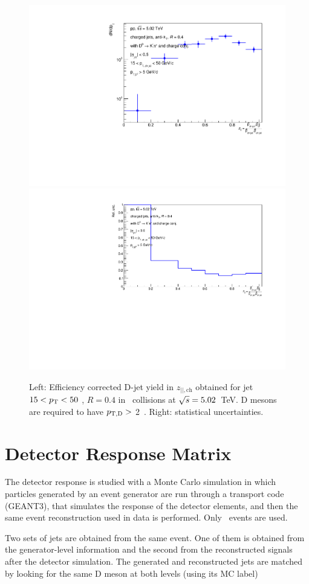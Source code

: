 \begin{figure}[bth]
\centering
\includegraphics[width=0.45\linewidth]{pp_2sig/R4_jetbin_15_50/jetPtSpectrum_SB_RebinProb_pTD5}
\includegraphics[width=0.45\linewidth]{pp_2sig/R4_jetbin_15_50/jetPtSpectrumUnc_SB_Rebin_pTD5}
\caption{Left: Efficiency corrected D-jet yield in $z_{||,\text{ch}}$ obtained for jet $15<p_{\text T}<50$ \GeVc, $R=0.4$ in \pp\ collisions at $\sqrt{s}=5.02$~TeV. D mesons are required to have $p_{\mathrm{T,D}}>$ 2~\GeVc. Right: statistical uncertainties.}
\label{fig:eq_pp_effCorr15_50_R4}
\end{figure}


\section{ Detector Response Matrix}

The detector response is studied with a Monte Carlo simulation in which particles generated by an event generator are
run through a transport code (GEANT3), that simulates the response of the detector elements, and then the same event reconstruction used in data is performed. Only \ccbar\ events are used.

Two sets of jets are obtained from the same event. One of them is obtained from the generator-level information and the second from the reconstructed signals after the detector simulation. 
The generated and reconstructed jets are matched by looking for the same D meson at both levels (using its MC label)

